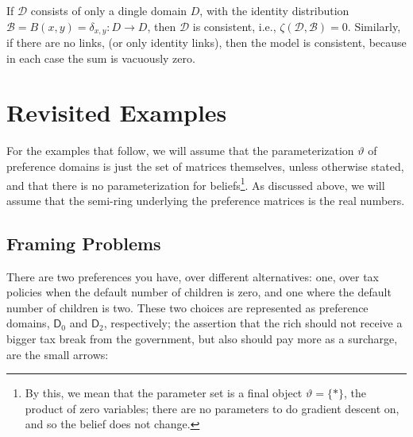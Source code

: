 \documentclass{article}
\begin{document}
 	\begin{remark}
 		If $\mathcal D$ consists of only a dingle domain $D$, with the identity distribution $\mathcal B = {B(x,y) = \delta_{x,y}: D \to D}$, then $\mathcal D$ is consistent, i.e., $\zeta(\mathcal D, \mathcal B) = 0$. Similarly, if there are no links, (or only identity links), then the model is consistent, because in each case the sum is vacuously zero. 
 	\end{remark}
 	

	
		
	\section{Revisited Examples}
	For the examples that follow, we will assume that the parameterization $\vartheta$ of preference domains is just the set of matrices themselves, unless otherwise stated, and that there is no parameterization for beliefs\footnote{By this, we mean that the parameter set is a final object $\vartheta = \{*\}$, the product of zero variables; there are no parameters to do gradient descent on, and so the belief does not change. }. As discussed above, we will assume that the semi-ring underlying the preference matrices is the real numbers.
	
	\subsection{Framing Problems}
	
	There are two preferences you have, over different alternatives: one, over tax policies when the default number of children is zero, and one where the default number of children is two. These two choices are represented as preference domains, $\mathsf D_0$ and $\mathsf D_2$, respectively; the assertion that the rich should not receive a bigger tax break from the government, but also should pay more as a surcharge, are the small arrows:
	
\end{document}
